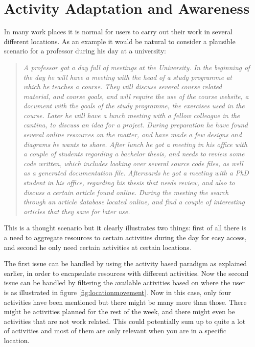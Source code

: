 \section{Activity Adaptation and Awareness}
\label{sec:adaptaware}
In many work places it is normal for users to carry out their work in several different locations. As an example it would be natural to consider a plausible scenario for a professor during his day at a university:

\begin{quotation}
\emph{
A professor got a day full of meetings at the University. In the beginning of the day he will have a meeting with the head of a study programme at which he teaches a course. They will discuss several course related material, and course goals, and will require the use of the course website, a document with the goals of the study programme, the exercises used in the course. Later he will have a lunch meeting with a fellow colleague in the cantina, to discuss an idea for a project. During preparation he have found several online resources on the matter, and have made a few designs and diagrams he wants to share. After lunch he got a meeting in his office with a couple of students regarding a bachelor thesis, and needs to review some code written, which includes looking over several source code files, as well as a generated documentation file. Afterwards he got a meeting with a PhD student in his office, regarding his thesis that needs review, and also to discuss a certain article found online. During the meeting the search through an article database located online, and find a couple of interesting articles that they save for later use.
}
\end{quotation}

This is a thought scenario but it clearly illustrates two things: first of all there is a need to aggregate resources to certain activities during the day for easy access, and second he only need certain activities at certain locations.

The first issue can be handled by using the activity based paradigm as explained earlier, in order to encapsulate resources with different activities. Now the second issue can be handled by filtering the available activities based on where the user is as illustrated in figure \ref{fig:locationmovement}. Now in this case, only four activities have been mentioned but there might be many more than those. There might be activities planned for the rest of the week, and there might even be activities that are not work related. This could potentially sum up to quite a lot of activities and most of them are only relevant when you are in a specific location.

